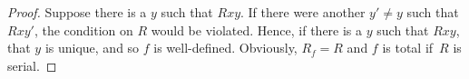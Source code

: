 \documentclass[../../../include/open-logic-section]{subfiles}
\begin{document}
\begin{proof}
Suppose there is a $y$ such that $Rxy$.  If there were another $y'
\neq y$ such that $Rxy'$, the condition on $R$ would be
violated. Hence, if there is a $y$ such that $Rxy$, that $y$ is
unique, and so $f$ is well-defined.  Obviously, $R_f = R$ and $f$ is
total if~$R$ is serial.
\end{proof}
\end{document}

